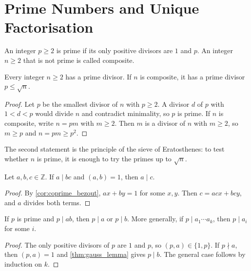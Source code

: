 \section{Prime Numbers and Unique Factorisation}

\begin{definition}\label{def:prime}
    An integer $p \ge 2$ is prime if its only positive divisors are $1$ and $p$. An integer $n \ge 2$ that is not prime is called composite.
\end{definition}

\begin{lemma}\label{lem:prime_divisor}
    Every integer $n \ge 2$ has a prime divisor. If $n$ is composite, it has a prime divisor $p \le \sqrt{n}$.
\end{lemma}
\begin{proof}
    Let $p$ be the smallest divisor of $n$ with $p \ge 2$. A divisor $d$ of $p$ with $1 < d < p$ would divide $n$ and contradict minimality, so $p$ is prime. If $n$ is composite, write $n = pm$ with $m \ge 2$. Then $m$ is a divisor of $n$ with $m \ge 2$, so $m \ge p$ and $n = pm \ge p^2$.
\end{proof}
The second statement is the principle of the sieve of Eratosthenes: to test whether $n$ is prime, it is enough to try the primes up to $\sqrt{n}$.

\begin{theorem}\label{thm:gauss_lemma}
    Let $a,b,c \in \mathbb{Z}$. If $a \mid bc$ and $(a,b) = 1$, then $a \mid c$.
\end{theorem}
\begin{proof}
    By \cref{cor:coprime_bezout}, $ax + by = 1$ for some $x,y$. Then $c = acx + bcy$, and $a$ divides both terms.
\end{proof}

\begin{corollary}\label{cor:euclid_lemma}
    If $p$ is prime and $p \mid ab$, then $p \mid a$ or $p \mid b$. More generally, if $p \mid a_1 \cdots a_k$, then $p \mid a_i$ for some $i$.
\end{corollary}
\begin{proof}
    The only positive divisors of $p$ are $1$ and $p$, so $(p,a) \in \{1, p\}$. If $p \nmid a$, then $(p,a) = 1$ and \cref{thm:gauss_lemma} gives $p \mid b$. The general case follows by induction on $k$.
\end{proof}

